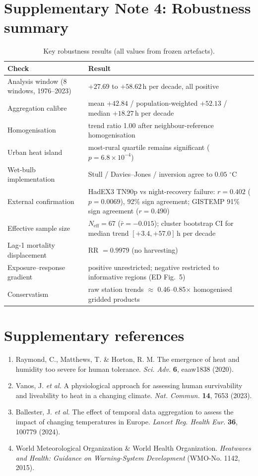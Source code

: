 \documentclass[12pt,a4paper]{article}
\newcommand{\dd}{\ensuremath{\,^{\circ}\mathrm{C}}}
\begin{document}
\section*{Supplementary Note 4: Robustness summary}
\begin{table}[htbp]
\centering\small
\caption{Key robustness results (all values from frozen artefacts).}
\begin{tabular}{p{7.2cm}p{7.6cm}}
\toprule
Check & Result \\
\midrule
Analysis window (8 windows, 1976--2023) & $+27.69$ to $+58.62$\,h per decade, all positive \\
Aggregation calibre & mean $+42.84$ / population-weighted $+52.13$ / median $+18.27$\,h per decade \\
Homogenisation & trend ratio 1.00 after neighbour-reference homogenisation \\
Urban heat island & most-rural quartile remains significant ($p=6.8\times10^{-4}$) \\
Wet-bulb implementation & Stull / Davies--Jones / inversion agree to $0.05\,\dd$ \\
External confirmation & HadEX3 TN90p vs night-recovery failure: $r=0.402$ ($p=0.0069$), 92\% sign agreement; GISTEMP 91\% sign agreement ($r=0.490$) \\
Effective sample size & $N_\mathrm{eff}=67$ ($\bar r=-0.015$); cluster bootstrap CI for median trend $[+3.4,+57.0]$\,h per decade \\
Lag-1 mortality displacement & RR $=0.9979$ (no harvesting) \\
Exposure--response gradient & positive unrestricted; negative restricted to informative regions (ED Fig.~5) \\
Conservatism & raw station trends $\approx$ 0.46--0.85$\times$ homogenised gridded products \\
\bottomrule
\end{tabular}
\end{table}

\section*{Supplementary references}
\begin{enumerate}
\item Raymond, C., Matthews, T. \& Horton, R. M. The emergence of heat and humidity too severe for
human tolerance. \textit{Sci. Adv.} \textbf{6}, eaaw1838 (2020).
\item Vanos, J. \textit{et al.} A physiological approach for assessing human survivability and
liveability to heat in a changing climate. \textit{Nat. Commun.} \textbf{14}, 7653 (2023).
\item Ballester, J. \textit{et al.} The effect of temporal data aggregation to assess the impact of
changing temperatures in Europe. \textit{Lancet Reg. Health Eur.} \textbf{36}, 100779 (2024).
\item World Meteorological Organization \& World Health Organization. \textit{Heatwaves and
Health: Guidance on Warning-System Development} (WMO-No. 1142, 2015).
\end{enumerate}
\end{document}
